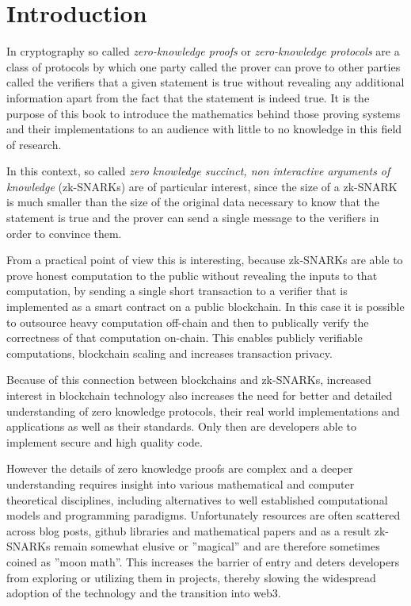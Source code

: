 \chapter{Introduction}
In cryptography so called \textit{zero-knowledge proofs} or \textit{zero-knowledge protocols} are a class of protocols by which one party called the prover can prove to other parties called the verifiers that a given statement is true without revealing any additional information apart from the fact that the statement is indeed true. It is the purpose of this book to introduce the mathematics behind those proving systems and their implementations to an audience with little to no knowledge in this field of research.

In this context, so called \textit{zero knowledge succinct, non interactive arguments of knowledge} (zk-SNARKs) are of particular interest, since the size of a zk-SNARK is much smaller than the size of the original data necessary to know that the statement is true and the prover can send a single message to the verifiers in order to convince them.

From a practical point of view this is interesting, because zk-SNARKs are able to prove honest computation to the public without revealing the inputs to that computation, by sending a single short transaction to a verifier that is implemented as a smart contract on a public blockchain. In this case it is possible to outsource heavy computation off-chain and then to publically verify the correctness of that computation on-chain. This enables publicly verifiable computations, blockchain scaling and increases transaction privacy.  

Because of this connection between blockchains and zk-SNARKs, increased interest in blockchain technology also increases the need for better and detailed understanding of zero knowledge protocols, their real world implementations and applications as well as their standards. Only then are developers able to implement secure and high quality code.

However the details of zero knowledge proofs are complex and a deeper understanding requires insight into various mathematical and computer theoretical disciplines, including alternatives to well established computational models and programming paradigms. Unfortunately resources are often scattered across blog posts, github libraries and mathematical papers and as a result zk-SNARKs remain somewhat elusive or ''magical'' and are therefore sometimes coined as ''moon math''. This increases the barrier of entry and deters developers from exploring or utilizing them in projects, thereby slowing the widespread adoption of the technology and the transition into web3.

